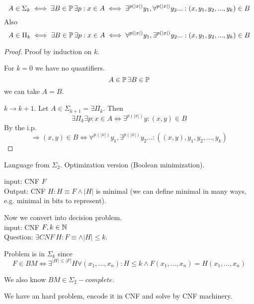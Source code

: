 \begin{consequence}
	\[ A \in \Sigma_k \iff \exists B \in \operatorname{\mathbb{P}} \exists p: x \in A \iff \exists^{p(|x|)} y_1, \forall^{p(|x|)} y_2 ... : (x, y_1, y_2, ..., y_k) \in B \]
	Also
	\[ A \in \Pi_k \iff \exists B \in \operatorname{\mathbb{P}} \exists p: x \in A \iff \forall^{p(|x|)} y_1, \exists^{p(|x|)} y_2 ... : (x, y_1, y_2, ..., y_k) \in B \]
\end{consequence}
\begin{proof}
	Proof by induction on $k$.

	For $k = 0$ we have no quantifiers.
	\[ A \in \operatorname{\mathbb{P}} \exists B \in \operatorname{\mathbb{P}} \]
	we can take $A = B$.

	$k \to k + 1$. Let $A \in \Sigma_{k + 1} = \exists \Pi_k$.
	Then
	\[ \exists \Pi_k \exists p: x \in A \iff \exists^{p(|x|)} y: (x,y) \in B \]
	By the i.p.
	\[ \Rightarrow (x,y) \in B \iff \forall^{p(|x|)} y_1, \exists^{p(|x|)} y_2 ... : ((x,y), y_1, y_2, ..., y_k) \]
\end{proof}

\begin{example}
	Language from $\Sigma_2$.
	Optimization version (Boolean minimization).

	input: CNF $F$\\
	Output: CNF $H: H \equiv F \land |H|$ is minimal (we can define minimal in many ways, e.g. minimal in bits to represent).

	Now we convert into decision problem.\\
	input: CNF $F, k \in \operatorname{\mathbb{N}}$ \\
	Question: $\exists CNF\ H: F \equiv \land |H| \leq k $.

	Problem is in $\Sigma_k$ since
	\[ F \in BM \iff \exists^{|H| \leq |F|} H \forall (x_1, ..., x_n): H \leq k \land F(x_1, ..., x_n) = H(x_1, ..., x_n) \]

	We also know $BM \in \Sigma_2-complete$.
\end{example}

We have an hard problem, encode it in CNF and solve by CNF machinery.

